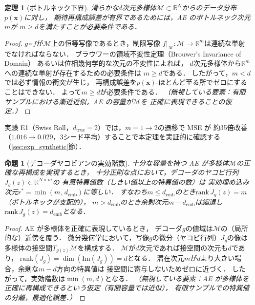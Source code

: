 \documentclass[12pt,a4paper]{jsarticle}
\newtheorem{theorem}{定理}
\newtheorem{proposition}{命題}
\newcommand{\dtrue}{d_{\mathrm{true}}}
\newcommand{\Jg}{J_g}
\newcommand{\R}{\mathbb{R}}
\newcommand{\demb}{d_{\mathrm{emb}}}
\begin{document}
\begin{theorem}[ボトルネック下界]\label{thm:lower_bound}
滑らかな$d$次元多様体$\mathcal{M} \subset \R^N$からのデータ分布$p(\boldsymbol{x})$に対し，
期待再構成誤差が有界であるためには，AE のボトルネック次元$m$が
$m \geq d$を満たすことが必要条件である．
\end{theorem}
\begin{proof}
$g \circ f$が$\mathcal{M}$上の恒等写像であるとき，制限写像
$f|_\mathcal{M}: \mathcal{M} \to \R^m$は連続な単射でなければならない．
ブラウワーの領域不変性定理（Brouwer's Invariance of Domain）
あるいは位相幾何学的な次元の不変性によれば，
$d$次元多様体から$\R^m$への連続な単射が存在するための必要条件は
$m \geq d$である．
したがって，$m < d$では必ず情報の衝突が生じ，
再構成誤差を$p(\boldsymbol{x})$-ほとんど至る所でゼロにすることはできない．
よって$m \geq d$が必要条件である．
\textit{（無視している要素：有限サンプルにおける漸近近似，AE の容量が$\mathcal{M}$を
正確に表現できることの仮定．）}
\end{proof}

実験 E1（Swiss Roll，$\dtrue = 2$）では，$m=1\to 2$の遷移で MSE が
約35倍改善（$1.016 \to 0.029$，3シード平均）することで本定理を実証的に確認する
（\ref{sec:exp_synthetic}節）．

\begin{proposition}[デコーダヤコビアンの実効階数]\label{thm:rank}
十分な容量を持つ AE が多様体$\mathcal{M}$の正確な再構成を実現するとき，
十分正則な点において，デコーダのヤコビ行列$\Jg(z) \in \R^{N\times m}$の
有意特異値数（しきい値以上の特異値の数）は
実効埋め込み次元$r^* = \min(m,\, \demb)$に等しい．
すなわち$m \leq \demb$のとき$\mathrm{rank}\,\Jg(z) = m$（ボトルネックが支配的），
$m > \demb$のとき余剰次元$m - \demb$は縮退し$\mathrm{rank}\,\Jg(z) = \demb$となる．
\end{proposition}
\begin{proof}
AE が多様体を正確に表現しているとき，
デコーダ$g$の値域は$\mathcal{M}$の（局所的な）近傍を覆う．
微分幾何学において，写像$g$の微分（ヤコビ行列）$\Jg$の像は
多様体の接空間$T_{g(z)}\mathcal{M}$を構成する．
$\mathcal{M}$が$d$次元であれば接空間の次元も$d$であり，
$\mathrm{rank}(\Jg) = \dim(\mathrm{Im}(\Jg)) = d$となる．
潜在次元$m$が$d$より大きい場合，余剰な$m - d$方向の特異値は
接空間に寄与しないためゼロに近づく．
したがって，実効階数は$\min(m, d)$となる．
\textit{（無視している要素：AE が多様体を正確に再構成できるという仮定（有限容量では近似），
有限サンプルでの特異値の分離，最適化誤差．）}
\end{proof}
\end{document}

